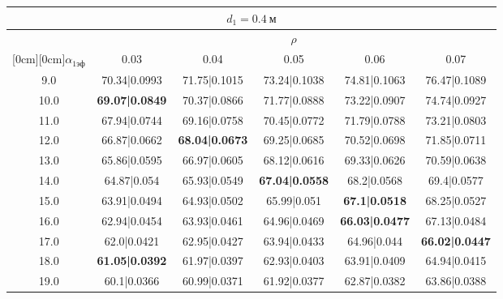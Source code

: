 \documentclass[20pt]{article}
\begin{document}
\begin{center}
\begin{tabular}{c|ccccc}
\hline
	\multicolumn{6}{c}{$d_{1}=0.4 \ м$} \\
\hline
	 & \multicolumn{5}{|c}{$\rho$} \\
	\cline{2-6}
	\raisebox{1.5ex}[0cm][0cm]{$\alpha_{1эф}$} & 0.03 & 0.04 & 0.05 & 0.06 & 0.07\\
\hline
	9.0 & 	70.34|0.0993 & 	71.75|0.1015 & 	73.24|0.1038 & 	74.81|0.1063 & 	76.47|0.1089\\
	10.0 & 	\textbf{69.07|0.0849} & 	70.37|0.0866 & 	71.77|0.0888 & 	73.22|0.0907 & 	74.74|0.0927\\
	11.0 & 	67.94|0.0744 & 	69.16|0.0758 & 	70.45|0.0772 & 	71.79|0.0788 & 	73.21|0.0803\\
	12.0 & 	66.87|0.0662 & 	\textbf{68.04|0.0673} & 	69.25|0.0685 & 	70.52|0.0698 & 	71.85|0.0711\\
	13.0 & 	65.86|0.0595 & 	66.97|0.0605 & 	68.12|0.0616 & 	69.33|0.0626 & 	70.59|0.0638\\
	14.0 & 	64.87|0.054 & 	65.93|0.0549 & 	\textbf{67.04|0.0558} & 	68.2|0.0568 & 	69.4|0.0577\\
	15.0 & 	63.91|0.0494 & 	64.93|0.0502 & 	65.99|0.051 & 	\textbf{67.1|0.0518} & 	68.25|0.0527\\
	16.0 & 	62.94|0.0454 & 	63.93|0.0461 & 	64.96|0.0469 & 	\textbf{66.03|0.0477} & 	67.13|0.0484\\
	17.0 & 	62.0|0.0421 & 	62.95|0.0427 & 	63.94|0.0433 & 	64.96|0.044 & 	\textbf{66.02|0.0447}\\
	18.0 & 	\textbf{61.05|0.0392} & 	61.97|0.0397 & 	62.93|0.0403 & 	63.91|0.0409 & 	64.94|0.0415\\
	19.0 & 	60.1|0.0366 & 	60.99|0.0371 & 	61.92|0.0377 & 	62.87|0.0382 & 	63.86|0.0388\\
\end{tabular}


\end{center}
\end{document}
